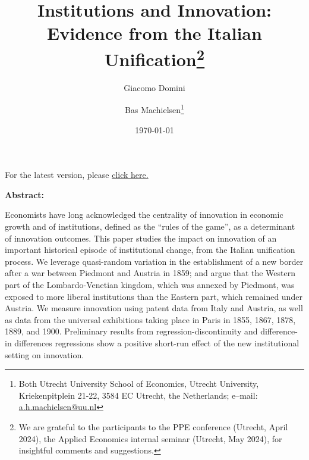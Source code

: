 

\title{Institutions and Innovation: \\ Evidence from the Italian Unification\footnote{We are grateful to the participants to the PPE conference (Utrecht, April 2024), the Applied Economics internal seminar (Utrecht, May 2024), for insightful comments and suggestions.}}
\author{Giacomo Domini \and Bas Machielsen\footnote{Both Utrecht University School of Economics, Utrecht University, Kriekenpitplein 21-22, 3584 EC Utrecht, the Netherlands; e--mail: \href{mailto:a.h.machielsen@uu.nl}{a.h.machielsen@uu.nl}}}
\date{\today}



\maketitle

\begin{center}
    For the latest version, please \href{http://link.com/paper.pdf}{click here.}
\end{center}

\begin{center} \textbf{Abstract:} \end{center}


\noindent Economists have long acknowledged the centrality of innovation in economic growth and of institutions, defined as the “rules of the game”, as a determinant of innovation outcomes. This paper studies the impact on innovation of an important historical episode of institutional change, from the Italian unification process. We leverage quasi-random variation in the establishment of a new border after a war between Piedmont and Austria in 1859; and argue that the Western part of the Lombardo-Venetian kingdom, which was annexed by Piedmont, was exposed to more liberal institutions than the Eastern part, which remained under Austria. We measure innovation using  patent data from Italy and Austria, as well as data from the universal exhibitions taking place in Paris in 1855, 1867, 1878, 1889, and 1900. Preliminary results from regression-discontinuity and difference-in differences regressions show a positive short-run effect of the new institutional setting on innovation.


